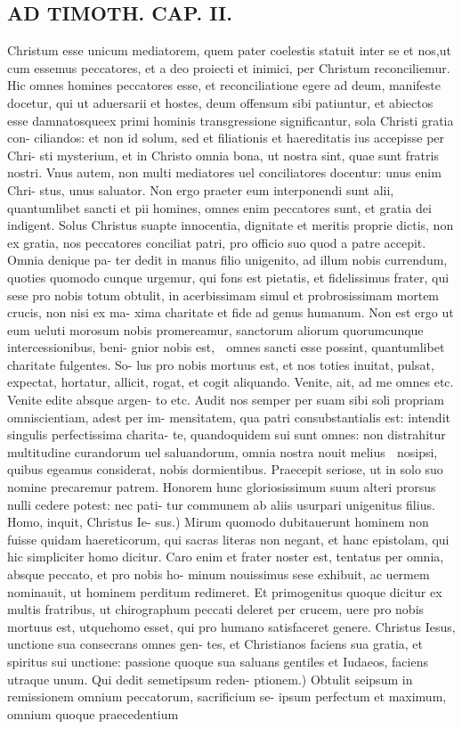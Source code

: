 \documentclass{article}
\begin{document}
\begin{pages}
\section*{AD TIMOTH. CAP. II. }
\marginpar{[ p.485 ]}\pstart Christum esse unicum mediatorem, quem pater coelestis statuit inter se et nos,ut cum essemus peccatores, et a deo proiecti et inimici, per Christum reconciliemur. Hic omnes homines peccatores esse, et reconciliatione egere ad deum, manifeste docetur, qui ut aduersarii et hostes, deum offensum sibi patiuntur, et abiectos esse damnatosqueex primi hominis transgressione significantur, sola Christi gratia con- ciliandos: et non id solum, sed et filiationis et haereditatis ius accepisse per Chri- sti mysterium, et in Christo omnia bona, ut nostra sint, quae sunt fratris nostri. Vnus autem, non multi mediatores uel conciliatores docentur: unus enim Chri- stus, unus saluator. Non ergo praeter eum interponendi sunt alii, quantumlibet sancti et pii homines, omnes enim peccatores sunt, et gratia dei indigent. Solus Christus suapte innocentia, dignitate et meritis proprie dictis, non ex gratia, nos peccatores conciliat patri, pro officio suo quod a patre accepit. Omnia denique  pa- ter dedit in manus filio unigenito, ad illum nobis currendum, quoties quomodo cunque  urgemur, qui fons est pietatis, et fidelissimus frater, qui sese pro nobis totum obtulit, in acerbissimam simul et probrosissimam mortem crucis, non nisi ex ma- xima charitate et fide ad genus humanum. Non est ergo ut eum ueluti morosum nobis promereamur, sanctorum aliorum quorumcunque  intercessionibus, beni- gnior nobis est,  omnes sancti esse possint, quantumlibet charitate fulgentes. So- lus pro nobis mortuus est, et nos toties inuitat, pulsat, expectat, hortatur, allicit, rogat, et cogit aliquando. Venite, ait, ad me omnes etc. Venite edite absque  argen- to etc. Audit nos semper per suam sibi soli propriam omniscientiam, adest per im- mensitatem, qua patri consubstantialis est: intendit singulis perfectissima charita- te, quandoquidem sui sunt omnes: non distrahitur multitudine curandorum uel saluandorum, omnia nostra nouit melius  nosipsi, quibus egeamus considerat, nobis dormientibus. Praecepit seriose, ut in solo suo nomine precaremur patrem. Honorem hunc gloriosissimum suum alteri prorsus nulli cedere potest: nec pati- tur communem ab aliis usurpari unigenitus filius. Homo, inquit, Christus Ie- sus.) Mirum quomodo dubitauerunt hominem non fuisse quidam haereticorum, qui sacras literas non negant, et hanc epistolam, qui hic simpliciter homo dicitur. Caro enim et frater noster est, tentatus per omnia, absque  peccato, et pro nobis ho- minum nouissimus sese exhibuit, ac uermem nominauit, ut hominem perditum redimeret. Et primogenitus quoque  dicitur ex multis fratribus, ut chirographum peccati deleret per crucem, uere pro nobis mortuus est, utquehomo esset, qui pro humano satisfaceret genere. Christus Iesus, unctione sua consecrans omnes gen- tes, et Christianos faciens sua gratia, et spiritus sui unctione: passione quoque  sua saluans gentiles et Iudaeos, faciens utraque  unum. Qui dedit semetipsum reden- ptionem.) Obtulit seipsum in remissionem omnium peccatorum, sacrificium se- ipsum perfectum et maximum, omnium quoque  praecedentium 
\end{pages}
\end{document}
